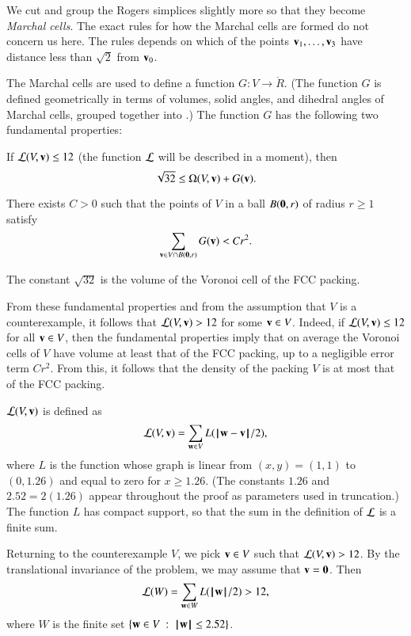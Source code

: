 We cut and group the Rogers simplices slightly more so that they
become {\it Marchal cells}.  The exact rules for how the Marchal cells
are formed do not concern us here.  The rules depends on which of the
points ${\mathbf v}_1,\ldots,{\mathbf v}_3$ have distance less than $\sqrt2$ from
${\mathbf v}_0$.

The Marchal cells are used to define a function $G:V\to \ring{R}$.
(The function $G$ is defined geometrically in terms of volumes, solid
angles, and dihedral angles of Marchal cells, grouped together into
.)  The function $G$ has the following two
fundamental properties:
\begin{description}
\item {} If ${\mathcal L}(V,{\mathbf v})\le 12$ 
(the function ${\mathcal L}$ will be described in a moment), then 
\[
\sqrt{32}\le \Omega(V,{\mathbf v}) +G({\mathbf v}).
\]
\item {}   There exists $C>0$ such that the points of $V$ in a ball $B({\mathbf 0},r)$
of radius $r\ge 1$ satisfy
\[
\sum_{{\mathbf v}\in V \cap B({\mathbf 0},r)} G({\mathbf v}) < C r^2.
\]
\end{description}
The constant $\sqrt{32}$ is the volume of the Voronoi cell of the FCC packing.

From these fundamental properties and from the assumption that $V$ is a counterexample,
it follows that ${\mathcal L}(V,{\mathbf v})>12$ for some ${\mathbf v}\in V$.  Indeed, if ${\mathcal L}(V,{\mathbf v})\le 12$ for all
${\mathbf v}\in V$, then the fundamental properties
imply that on average the Voronoi cells of $V$ have volume at least that of the FCC packing, up to a negligible error term $C r^2$.  From this, it follows that the density
of the packing $V$ is at most that of the FCC packing.

 ${\mathcal L}(V,{\mathbf v})$ is defined as
\[
\CalL(V,\v) = \sum_{\w\in V} L(\norm{\w}{\v}/2),
\]
where $L$ is the function whose graph is linear from $(x,y)=(1,1)$ to $(0,1.26)$ and equal
to zero for $x\ge 1.26$.  (The constants $1.26$ and $2.52=2(1.26)$ appear throughout the
proof as parameters used in truncation.)   
The function $L$ has compact support, so that the sum in the
definition of ${\mathcal L}$ is a finite sum.

Returning to the counterexample $V$, we pick ${\mathbf v}\in V$ such that
${\mathcal L}(V,{\mathbf v})>12$.  By the translational invariance of the problem, we
may assume that ${\mathbf v}={\mathbf 0}$.  Then
\begin{equation}\label{eqn:LW}
{\mathcal L}(W) = \sum_{{\mathbf w}\in W} L({{\hskip0.1em|\hskip-0.15em|\hskip0.1em}{\mathbf w}{\hskip0.1em|\hskip-0.15em|\hskip0.1em}}/2)  > 12,
\end{equation}
where $W$ is the finite set  $\{{\mathbf w}\in V\ :\  {{\hskip0.1em|\hskip-0.15em|\hskip0.1em}{\mathbf w}{\hskip0.1em|\hskip-0.15em|\hskip0.1em}} \le 2.52\}$.

